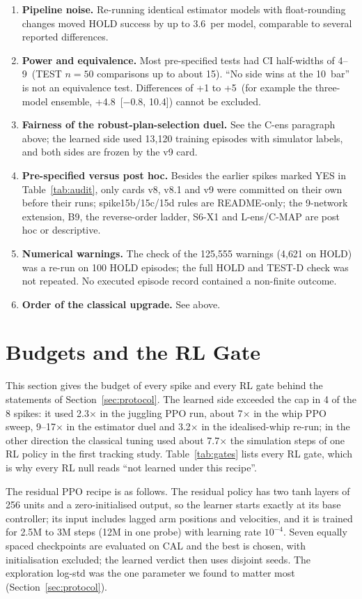 \begin{enumerate}
\item \textbf{Pipeline noise.} Re-running identical estimator models with float-rounding changes moved HOLD success by up to 3.6\pp\ per model, comparable to several reported differences.
\item \textbf{Power and equivalence.} Most pre-specified tests had CI half-widths of 4--9\pp\ (TEST $n{=}50$ comparisons up to about 15\pp). ``No side wins at the 10\pp\ bar'' is not an equivalence test. Differences of +1 to +5\pp\ (for example the three-model ensemble, +4.8\pp\ [$-0.8$, 10.4]) cannot be excluded.
\item \textbf{Fairness of the robust-plan-selection duel.} See the C-ens paragraph above; the learned side used 13{,}120 training episodes with simulator labels, and both sides are frozen by the v9 card.
\item \textbf{Pre-specified versus post hoc.} Besides the earlier spikes marked YES in Table~\ref{tab:audit}, only cards v8, v8.1 and v9 were committed on their own before their runs; spike15b/15c/15d rules are README-only; the 9-network extension, B9, the reverse-order ladder, S6-X1 and L-ens/C-MAP are post hoc or descriptive.
\item \textbf{Numerical warnings.} The check of the 125{,}555 warnings (4{,}621 on HOLD) was a re-run on 100 HOLD episodes; the full HOLD and TEST-D check was not repeated. No executed episode record contained a non-finite outcome.
\item \textbf{Order of the classical upgrade.} See above.
\end{enumerate}

\section{Budgets and the RL Gate}
\label{app:budget}

This section gives the budget of every spike and every RL gate behind the statements of Section~\ref{sec:protocol}. The learned side exceeded the cap in 4 of the 8 spikes: it used 2.3$\times$ in the juggling PPO run, about 7$\times$ in the whip PPO sweep, 9--17$\times$ in the estimator duel and 3.2$\times$ in the idealised-whip re-run; in the other direction the classical tuning used about 7.7$\times$ the simulation steps of one RL policy in the first tracking study. Table~\ref{tab:gates} lists every RL gate, which is why every RL null reads ``not learned under this recipe''.

The residual PPO recipe is as follows. The residual policy has two tanh layers of 256 units and a zero-initialised output, so the learner starts exactly at its base controller; its input includes lagged arm positions and velocities, and it is trained for 2.5M to 3M steps (12M in one probe) with learning rate $10^{-4}$. Seven equally spaced checkpoints are evaluated on CAL and the best is chosen, with initialisation excluded; the learned verdict then uses disjoint seeds. The exploration log-std was the one parameter we found to matter most (Section~\ref{sec:protocol}).

